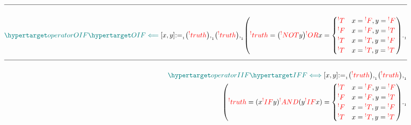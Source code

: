 \documentclass[a4paper]{article}
\def\ml{\mleft}
\def\mr{\mright}
\newcommand{\defeq}{:=}
\newcommand{\eq}{=}
\newcommand{\cusand}{,}
\newcommand{\cusend}{.}
\newcommand{\cusnum}[2]{{#1}_{{\phantom{ }}_{#2}}}
\newcommand{\n}{\\[1.5ex] \hline \nonumber \\[0ex]}
\newcommand{\m}{\nonumber \\}
\begin{document}
\begin{tcolorbox}
\begin{align}
    \n \dfn{operatorOIF} [\dfn{OIF}[\impliedby]][x, y] \cusnum{\defeq}{1} \ml(\rfr{truth} [x][]\mr) \cusnum{\cusand}{1} \ml(\rfr{truth} [y][]\mr) \cusnum{\cusand}{1} \ml(\rfr{truth} [x \rfr{OIF} y][] \eq \ml(\rfr{NOT} y\mr) \rfr{OR} x \eq \begin{cases} \rfr{T} & x \eq \rfr{F} \cusand y \eq \rfr{F} \\ \rfr{F} & x \eq \rfr{F} \cusand y \eq \rfr{T} \\ \rfr{T} & x \eq \rfr{T} \cusand y \eq \rfr{F} \\ \rfr{T} & x \eq \rfr{T} \cusand y \eq \rfr{T} \end{cases}\mr) \cusnum{\cusend}{1}
    \n \dfn{operatorIIF} [\dfn{IFF}[\iff]][x, y] \cusnum{\defeq}{1} \ml(\rfr{truth} [x][]\mr) \cusnum{\cusand}{1} \ml(\rfr{truth} [y][]\mr) \cusnum{\cusand}{1}
\m \ml(\rfr{truth} [x \rfr{IFF} y][] \eq (x \rfr{IF} y) \rfr{AND} (y \rfr{IF} x) \eq \begin{cases} \rfr{T} & x \eq \rfr{F} \cusand y \eq \rfr{F} \\ \rfr{F} & x \eq \rfr{F} \cusand y \eq \rfr{T} \\ \rfr{F} & x \eq \rfr{T} \cusand y \eq \rfr{F} \\ \rfr{T} & x \eq \rfr{T} \cusand y \eq \rfr{T} \end{cases}\mr) \cusnum{\cusend}{1}
\end{align}
\end{tcolorbox}
\end{document}
